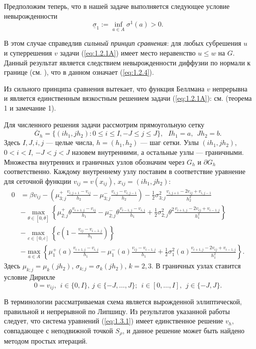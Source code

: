 Предположим теперь, что в нашей задаче выполняется следующее условие невырожденности
\begin{equation} \label{eq:1.2.4}
\underline{\sigma}_1:=\inf_{a\in A}\sigma^1(a)>0.
\end{equation}

В этом случае справедлив \emph{сильный принцип сравнения}: для любых субрешения $u$ и суперрешения $v$ задачи (\ref{eq:1.2.1A}) имеет место неравенство $u\le w$ на $G$. Данный результат является следствием невырожденности диффузии по нормали к границе (см. \cite{BarBur95, BarRou98}), что в данном означает (\ref{eq:1.2.4}).

Из сильного принципа сравнения вытекает, что функция Беллмана $v$ непрерывна и является единственным вязкостным решением задачи (\ref{eq:1.2.1A}): см. \cite{Rok14} (теорема 1 и замечание 1).

Для численного решения задачи рассмотрим прямоугольную сетку
$$\overline G_h=\{(ih_1,jh_2):0\le i\le I,-J\le j\le J\},\ \ \ Ih_1=a,\ \ Jh_2=b.$$
Здесь $I,J,i,j$ --- целые числа, $h=(h_1,h_2)$ --- шаг сетки. Узлы $(ih_1,jh_2)$, $0<i<I$, $-J<j<J $ назовем внутренними, а остальные узлы --- граничными. Множества внутренних и граничных узлов обозначим через $G_h$ и $\partial G_h$ соответственно. Каждому внутреннему узлу поставим в соответствие уравнение для сеточной функции $v_{ij}=v(x_{ij})$, $x_{ij}=(ih_1,jh_2)$:
\begin{align*}
0 &=\beta v_{ij} -\left(\mu_{3;j}^+ \frac{v_{i,j+1}-v_{ij}}{h_2}-\mu_{3;j}^-\frac{v_{i,j}-v_{i,j-1}}{h_2}\right)-\frac{1}{2}\sigma_{3;j}^2 \frac{v_{i,j+1}-2 v_{ij}+v_{i,j-1}}{h_2^2} \\
&-\max_{\theta\in [0,\overline\theta]}\left\{\mu_{2;j}^+\theta \frac{v_{i+1,j}-v_{ij}}{h_1} -\mu_{2;j}^- \theta \frac{v_{i-1,j}-v_{i,j}}{h_1} +\frac{1}{2}\sigma_{2;j}^2\theta^2 \frac{v_{i+1,j}-2 v_{ij}+v_{i-1,j}}{h_1^2}\right\}\\
&-\max_{c\in [0,\overline c]} \left\{c\left(1-\frac{v_{ij}-v_{i-1,j}}{h_1}\right)\right\}\\
& -\max_{a\in A}\left\{\mu_1^+(a) \frac{v_{i+1,j}-v_{i,j}}{h_1}-\mu_1^-(a) \frac{v_{ij}-v_{i-1,j}}{h_1}+\frac{1}{2}\sigma_1^2(a)\frac{v_{i+1,j}-2 v_{ij}+v_{i-1,j}}{h_1^2}\right\}.
\end{align*}
Здесь $\mu_{k;j}=\mu_k(jh_2)$, $\sigma_{k;j}=\sigma_k(jh_2)$, $k=2,3$. В граничных узлах ставится условие Дирихле
$$ 0=v_{ij},\ \ i\in\{0,I\},\ j\in \{-J,\dots,J\};\ \ i\in [0,\dots,I],\ \ j\in\{-J,J\}.$$

В терминологии \cite{Obe06} рассматриваемая схема является вырожденной эллиптической, правильной и непрерывной по Липшицу.
Из результатов указанной работы следует, что система уравнений (\ref{eq:1.3.1}) имеет единственное решение $v_h$, совпадающее с неподвижной точкой $S_\rho$, и данное решение может быть найдено методом простых итераций.

